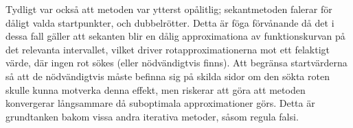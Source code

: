 \documentclass{article}
\begin{document}
Tydligt var också att metoden var ytterst opålitlig; sekantmetoden falerar för dåligt valda startpunkter, och dubbelrötter. Detta är föga förvånande då det i dessa fall gäller att sekanten blir en dålig approximationa av funktionskurvan på det relevanta intervallet, vilket driver rotapproximationerna mot ett felaktigt värde, där ingen rot sökes (eller nödvändigtvis finns). Att begränsa startvärderna så att de nödvändigtvis måste befinna sig på skilda sidor om den sökta roten skulle kunna motverka denna effekt, men riskerar att göra att metoden konvergerar långsammare då suboptimala approximationer görs. Detta är grundtanken bakom vissa andra iterativa metoder, såsom regula falsi.
\end{document}

